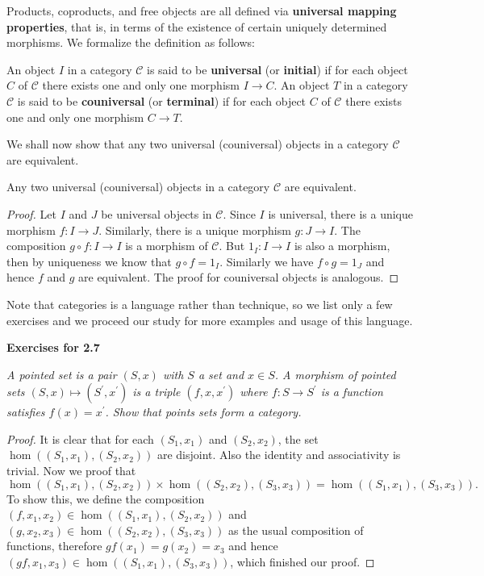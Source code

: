 Products, coproducts, and free objects are all defined via \textbf{universal mapping properties}, that is, in terms of the existence of certain uniquely determined morphisms. We formalize the definition as follows:
\begin{definition}
An object $I$ in a category $\mathcal{C}$ is said to be \textbf{universal} (or \textbf{initial}) if for each object $C$ of $\mathcal{C}$ there exists one and only one morphism $I\to C$. An object $T$ in a category $\mathcal{C}$ is said to be \textbf{couniversal} (or \textbf{terminal}) if for each object $C$ of $\mathcal{C}$ there exists one and only one morphism $C\to T$.
\end{definition}
We shall now show that any two universal (couniversal) objects in a category $\mathcal{C}$ are equivalent.
\begin{theorem}
Any two universal (couniversal) objects in a category $\mathcal{C}$ are equivalent.
\end{theorem}
\begin{proof}
Let $I$ and $J$ be universal objects in $\mathcal{C}$. Since $I$ is universal, there is a unique morphism $f:I\to J$. Similarly, there is a unique morphism $g:J\to I$. The composition $g\circ f:I\to I$ is a morphism of $\mathcal{C}$. But $1_I:I\to I$ is also a morphism, then by uniqueness we know that $g\circ f=1_I$. Similarly we have $f\circ g=1_J$ and hence $f$ and $g$ are equivalent. The proof for couniversal objects is analogous.
\end{proof}
Note that categories is a language rather than technique, so we list only a few exercises and we proceed our study for more examples and usage of this language.
\begin{center}
\begin{large}
    \textbf{Exercises for 2.7}
\end{large}
\end{center}
\begin{problem}\em
A pointed set is a pair $(S,x)$ with $S$ a set and $x\in S$. A morphism of pointed sets $(S,x)\mapsto(S^\prime,x^\prime)$ is a triple $(f,x,x^\prime)$ where $f:S\to S^\prime$ is a function satisfies $f(x)=x^\prime$. Show that points sets form a category.
\end{problem}
\begin{proof}
It is clear that for each $(S_1,x_1)$ and $(S_2,x_2)$, the set $\hom((S_1,x_1),(S_2,x_2))$ are disjoint. Also the identity and associativity is trivial. Now we proof that 
$$\hom((S_1,x_1),(S_2,x_2))\times\hom((S_2,x_2),(S_3,x_3))=\hom((S_1,x_1),(S_3,x_3)).$$
To show this, we define the composition $(f,x_1,x_2)\in\hom((S_1,x_1),(S_2,x_2))$ and $(g,x_2,x_3)\in\hom((S_2,x_2),(S_3,x_3))$ as the usual composition of functions, therefore $gf(x_1)=g(x_2)=x_3$ and hence $(gf,x_1,x_3)\in\hom((S_1,x_1),(S_3,x_3))$, which finished our proof.
\end{proof}

